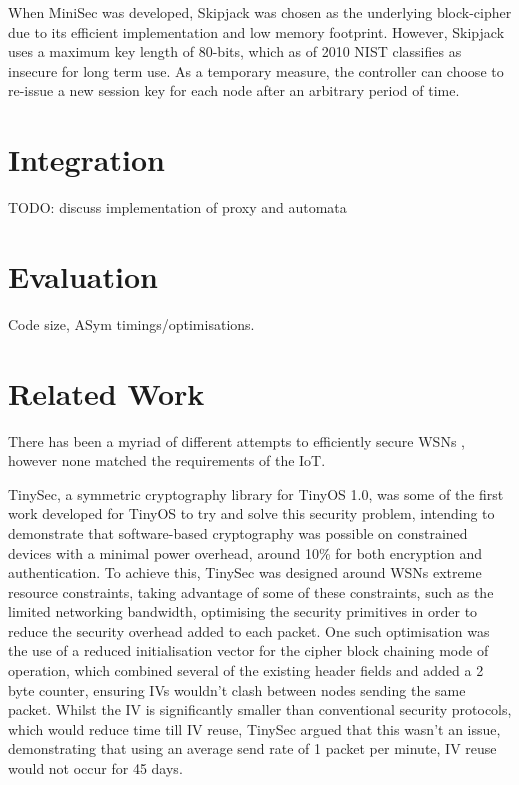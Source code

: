 \documentclass[conference]{./sty/IEEEtran}
\begin{document}
When MiniSec was developed, Skipjack was chosen as the underlying block-cipher due to its efficient implementation and low memory footprint\cite{Skipjack}. However, Skipjack uses a maximum key length of 80-bits, which as of 2010 NIST classifies as insecure for long term use\cite{NIST}. As a temporary measure, the controller can choose to re-issue a new session key for each node after an arbitrary period of time.  




\section{Integration} %
\label{sec:integration}
TODO: discuss implementation of proxy and automata

\section{Evaluation} %
\label{sec:evaluation}
Code size, ASym timings/optimisations.

\section{Related Work} %
\label{sec:related_work}
There has been a myriad of different attempts to efficiently secure WSNs \cite{TinySec,MiniSec,TinyECC,TinyPK,TinyPBC,Shi2013235,ContikiSec,MessageBottle,CertificatePairwise,MizanurRahman2010858}, however none matched the requirements of the IoT.

TinySec\cite{TinySec}, a symmetric cryptography library for TinyOS 1.0, was some of the first work developed for TinyOS to try and solve this security problem, intending to demonstrate that software-based cryptography was possible on constrained devices with a minimal power overhead, around 10\% for both encryption and authentication. To achieve this, TinySec was designed around WSNs extreme resource constraints, taking advantage of some of these constraints, such as the limited networking bandwidth, optimising the security primitives in order to reduce the security overhead added to each packet. One such optimisation was the use of a reduced initialisation vector for the cipher block chaining mode of operation, which combined several of the existing header fields and added a 2 byte counter, ensuring IVs wouldn't clash between nodes sending the same packet. Whilst the IV is significantly smaller than conventional security protocols, which would reduce time till IV reuse, TinySec argued that this wasn't an issue, demonstrating that using an average send rate of 1 packet per minute, IV reuse would not occur for 45 days.
\end{document}
